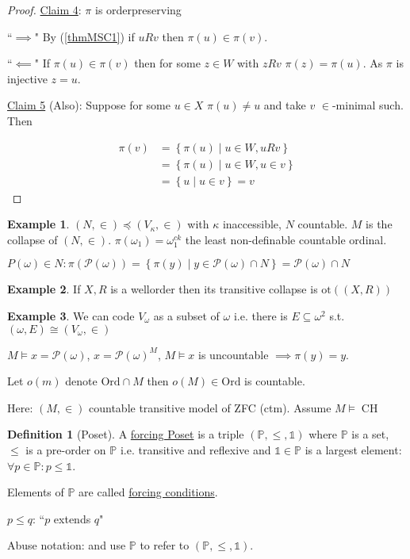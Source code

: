 \documentclass{scrartcl}
\renewcommand{\P}{\mathcal{P}}
\newcommand{\set}[1]{\left\{#1\right\}}
\DeclareMathOperator{\CH}{CH}
\theoremstyle{definition}
\newtheorem*{definition*}{Definition}
\newtheorem*{example*}{Example}
\theoremstyle{plain}
\theoremstyle{remark}
\begin{document}
\begin{proof}
		\underline{Claim 4}: $\pi$ is orderpreserving
		
		``$\implies$" By (\ref{thmMSC1}) if $uRv$ then $\pi(u) \in \pi(v)$.
		
		``$\impliedby$" If $\pi(u) \in \pi(v)$ then for some $z \in W$ with $zRv$ $\pi(z) = \pi(u)$. As $\pi$ is injective $z = u$.
		
		\underline{Claim 5} (Also):  Suppose for some $u \in X$ $\pi(u) \neq u$ and take $v$ $\in$-minimal such. Then
		
		\begin{align*}
			\pi(v) &= \set{\pi(u) \mid u \in W, uRv}\\
			&= \set{\pi(u) \mid u \in W, u \in v}\\
			&= \set{u \mid u \in v} = v
		\end{align*}
	\end{proof}

	\begin{example*}
		$(N, \in) \preceq (V_\kappa, \in)$ with $\kappa$ inaccessible, $N$ countable. $M$ is the collapse of $(N, \in)$. $\pi(\omega_1) = \omega_1^{ck}$ the least non-definable 
		countable ordinal.
		
		$P(\omega) \in N : \pi(\P(\omega)) = \set{\pi(y) \mid y \in \P(\omega) \cap N} = \P(\omega) \cap N$
	\end{example*}

	\begin{example*}
		If $X, R$ is a wellorder then its transitive collapse is $\text{ot}((X, R))$
	\end{example*}

	\begin{example*}
		We can code $V_\omega$ as a subset of $\omega$ i.e. there is $E \subseteq \omega^2$ s.t. $(\omega, E) \cong (V_\omega, \in)$
		
		$M \vDash x = \P(\omega)$, $x = \P(\omega)^M$, $M \vDash x$ is uncountable $\implies \pi(y) = y$.
		
		Let $o(m)$ denote $\text{Ord} \cap M$ then $o(M) \in \text{Ord} $ is countable. 
	\end{example*}
	
	Here: $(M, \in)$ countable transitive model of ZFC (ctm). Assume $M \vDash \CH$
	
	\begin{definition*}[Poset]
		A \underline{forcing Poset} is a triple $(\mathbb{P}, \leq, \mathbb{1})$ where $\mathbb{P}$ is a set, $\leq$ is a pre-order on $\mathbb{P}$ i.e. transitive and reflexive and $\mathbb{1} \in \mathbb{P}$ is a largest element: $\forall p \in \mathbb{P}: p \leq \mathbb{1}$.
		
		Elements of $\mathbb{P}$ are called \underline{forcing conditions}.
		
		$p \leq q$: ``$p$ extends $q$"
		
		Abuse notation: and use $\mathbb{P}$ to refer to $(\mathbb{P}, \leq, \mathbb{1})$.
	\end{definition*}
\end{document}
